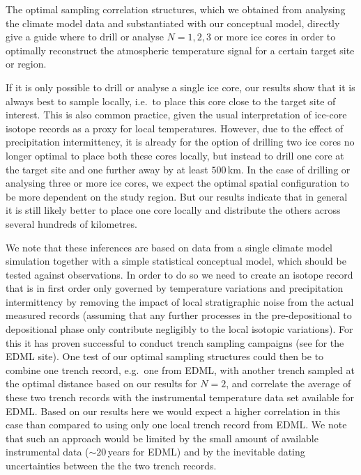 \documentclass[cp, manuscript]{copernicus}
\begin{document}
The optimal sampling correlation structures, which we obtained from analysing
the climate model data and substantiated with our conceptual model, directly
give a guide where to drill or analyse $N=1, 2, 3$ or more ice cores in order to
optimally reconstruct the atmospheric temperature signal for a certain target
site or region.

If it is only possible to drill or analyse a single ice core, our results
show that it is always best to sample locally, i.e.\ to place this core
close to the target site of interest. This is also common practice, given the
usual interpretation of ice-core isotope records as a proxy for local
temperatures. However, due to the effect of precipitation intermittency, it is
already for the option of drilling two ice cores no longer optimal to place both
these cores locally, but instead to drill one core at the target site and one
further away by at least $500$\,km. In the case of drilling or analysing three
or more ice cores, we expect the optimal spatial configuration to be more
dependent on the study region. But our results indicate that in general it is
still likely better to place one core locally and distribute the others across
several hundreds of kilometres.

We note that these inferences are based on data from a single climate model
simulation together with a simple statistical conceptual model, which should be
tested against observations. In order to do so we need to create an isotope
record that is in first order only governed by temperature variations and
precipitation intermittency by removing the impact of local stratigraphic noise
from the actual measured records (assuming that any further processes in the
pre-depositional to depositional phase only contribute negligibly to the local
isotopic variations). For this it has proven successful to conduct trench
sampling campaigns (see \citealp{Munch2016,Munch2017} for the EDML site). One
test of our optimal sampling structures could then be to combine one trench
record, e.g.\ one from EDML, with another trench sampled at the optimal distance
based on our results for $N=2$, and correlate the average of these two trench
records with the instrumental temperature data set available for EDML. Based on
our results here we would expect a higher correlation in this case than compared
to using only one local trench record from EDML. We note that such an approach
would be limited by the small amount of available instrumental data
($\sim20$\,years for EDML) and by the inevitable dating uncertainties between
the the two trench records.
\end{document}

